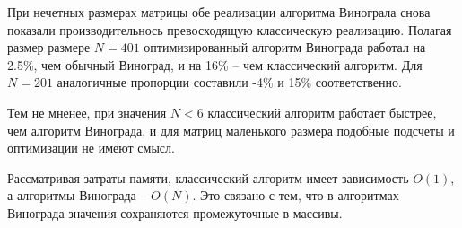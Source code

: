 При нечетных размерах матрицы обе реализации алгоритма Винограла снова показали производительнось превосходящую классическую реализацию.
Полагая размер размере $N=401$ оптимизированный алгоритм Винограда работал на 2.5\%, чем обычный Виноград, 
и на 16\% -- чем классический алгоритм. Для $N=201$ аналогичные пропорции составили 
-4\% и 15\% соответственно.

Тем не мненее, при значения $N<6$ классический алгоритм работает быстрее, чем алгоритм Винограда,
и для матриц маленького размера подобные подсчеты и оптимизации не имеют смысл.

Рассматривая затраты памяти, классический алгоритм имеет зависимость $O(1)$, а алгоритмы Винограда -- $O(N)$.
Это связано с тем, что в алгоритмах Винограда значения сохраняются промежуточные в массивы. 
